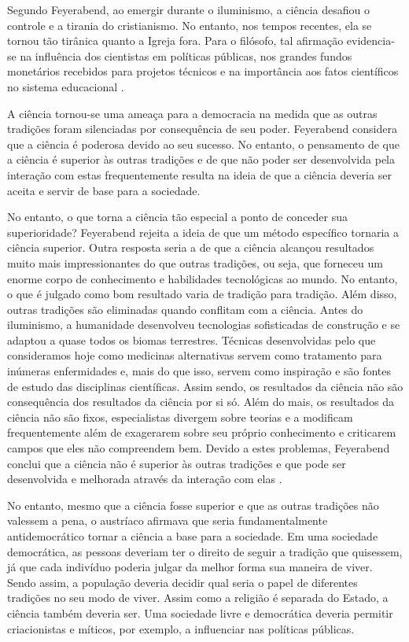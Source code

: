 \documentclass[12pt]{report}
\begin{document}
			Segundo Feyerabend, ao emergir durante o iluminismo, a ciência desafiou o controle e a tirania do cristianismo.
			No entanto, nos tempos recentes, ela se tornou tão tirânica quanto a Igreja fora.
			Para o filósofo, tal afirmação evidencia-se na influência dos cientistas em políticas públicas, nos grandes fundos monetários recebidos para projetos técnicos e na importância aos fatos científicos no sistema educacional \cite{feyerabend-science-free-society}.
		
			A ciência tornou-se uma ameaça para a democracia na medida que as outras tradições foram silenciadas por consequência de seu poder.
			Feyerabend considera que a ciência é poderosa devido ao seu sucesso.
			No entanto, o pensamento de que a ciência é superior às outras tradições e de que não poder ser desenvolvida pela interação com estas frequentemente resulta na ideia de que a ciência deveria ser aceita e servir de base para a sociedade.
		
			No entanto, o que torna a ciência tão especial a ponto de conceder sua superioridade? Feyerabend rejeita a ideia de que um método específico tornaria a ciência superior.
			Outra resposta seria a de que a ciência alcançou resultados muito mais impressionantes do que outras tradições, ou seja, que forneceu um enorme corpo de conhecimento e habilidades tecnológicas ao mundo.
			No entanto, o que é julgado como bom resultado varia de tradição para tradição.
			Além disso, outras tradições são eliminadas quando conflitam com a ciência.
			Antes do iluminismo, a humanidade desenvolveu tecnologias sofisticadas de construção e se adaptou a quase todos os biomas terrestres.
			Técnicas desenvolvidas pelo que consideramos hoje como medicinas alternativas servem como tratamento para inúmeras enfermidades e, mais do que isso, servem como inspiração e são fontes de estudo das disciplinas científicas.
			Assim sendo, os resultados da ciência não são consequência dos resultados da ciência por si só.
			Além do mais, os resultados da ciência não são fixos, especialistas divergem sobre teorias e a modificam frequentemente além de exagerarem sobre seu próprio conhecimento e criticarem campos que eles não compreendem bem.
			Devido a estes problemas, Feyerabend conclui que a ciência não é superior às outras tradições e que pode ser desenvolvida e melhorada através da interação com elas \cite{feyerabend-science-free-society}.
			
			No entanto, mesmo que a ciência fosse superior e que as outras tradições não valessem a pena, o austríaco afirmava que seria fundamentalmente antidemocrático tornar a ciência a base para a sociedade.
			Em uma sociedade democrática, as pessoas deveriam ter o direito de seguir a tradição que quisessem, já que cada indivíduo poderia julgar da melhor forma sua maneira de viver.
			Sendo assim, a população deveria decidir qual seria o papel de diferentes tradições no seu modo de viver.
			Assim como a religião é separada do Estado, a ciência também deveria ser.
			Uma sociedade livre e democrática deveria permitir criacionistas e míticos, por exemplo, a influenciar nas políticas públicas.
		
\end{document}
